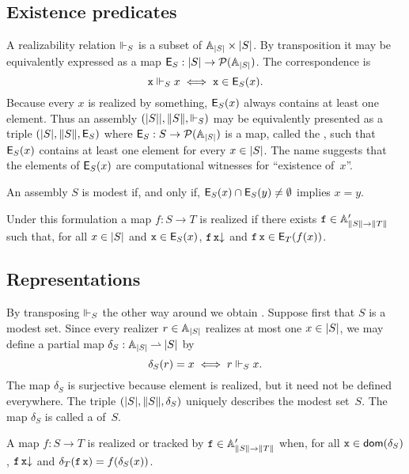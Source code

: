 \subsection{Existence predicates}
\label{sec:existence-predicates}

A realizability relation $\rz[S]$ is a subset of $\xAtyp{S} \times \S{S}$. By transposition it may be equivalently expressed
as a map $\Ex{S} : \S{S} \to \pow{\xAtyp{S}}$. The correspondence is
%
\begin{equation*}
  \R{x} \rz[S] x \iff \R{x} \in \Ex{S}(x).
\end{equation*}
%
Because every $x$ is realized by something, $\Ex{S}(x)$ always contains at least one element. Thus an assembly $\xasm{S}$ may be equivalently presented as a triple $(\S{S}, \T{S}, \Ex{S})$ where $\Ex{S} : S \to \pow{\xAtyp{S}}$ is a map, called the , such that $\Ex{S}(x)$ contains at least one element for every $x \in \S{S}$. The name suggests that the elements of $\Ex{S}(x)$ are computational witnesses for ``existence of~$x$''.

An assembly $S$ is modest if, and only if, $\Ex{S}(x) \cap \Ex{S}(y) \neq \emptyset$ implies $x = y$.

Under this formulation a map $f : S \to T$ is realized if there exists $\R{f} \in \subAtyp{\T{S} \to \T{T}}$ such that, for all $x \in \S{S}$ and $\R{x} \in \Ex{S}(x)$, $\defined{\R{f}\,\R{x}}$ and $\R{f}\,\R{x} \in \Ex{T}(f(x))$.

\subsection{Representations}
\label{sec:representations}

By transposing $\rz[S]$ the other way around we obtain . Suppose first that $S$ is a modest set. Since every realizer $r \in \xAtyp{S}$ realizes at most one $x \in \S{S}$, we may define a partial map $\delta_S : \xAtyp{S} \parto \S{S}$ by
%
\begin{equation*}
  \delta_S(r) = x \iff r \rz[S] x.
\end{equation*}
%
The map $\delta_S$ is surjective because element is realized, but it need not be defined everywhere. The triple $(\S{S}, \T{S}, \delta_S)$ uniquely describes the modest set~$S$. The map $\delta_S$ is called a  of~$S$.

A map $f : S \to T$ is realized or tracked by $\R{f} \in \subAtyp{\T{S} \to \T{T}}$ when, for all $\R{x} \in \dom{\delta_S}$, $\defined{\R{f}\,\R{x}}$ and $\delta_T(\R{f}\,\R{x}) = f(\delta_S(x))$.


